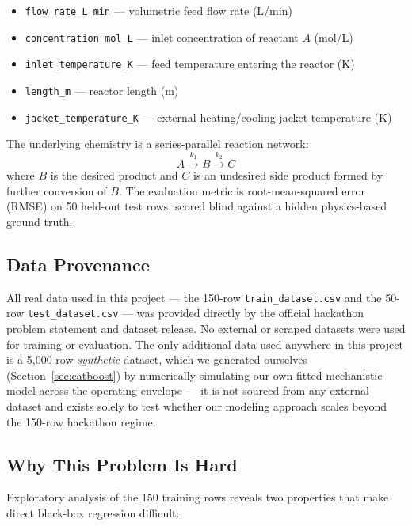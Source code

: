 \documentclass[11pt,a4paper]{article}
\begin{document}
\begin{itemize}[nosep]
  \item \texttt{flow\_rate\_L\_min} --- volumetric feed flow rate (L/min)
  \item \texttt{concentration\_mol\_L} --- inlet concentration of reactant $A$ (mol/L)
  \item \texttt{inlet\_temperature\_K} --- feed temperature entering the reactor (K)
  \item \texttt{length\_m} --- reactor length (m)
  \item \texttt{jacket\_temperature\_K} --- external heating/cooling jacket temperature (K)
\end{itemize}

\noindent The underlying chemistry is a series-parallel reaction network:
\begin{equation}
  A \xrightarrow{k_1} B \xrightarrow{k_2} C
\end{equation}
where $B$ is the desired product and $C$ is an undesired side product formed by further
conversion of $B$. The evaluation metric is root-mean-squared error (RMSE) on 50 held-out test
rows, scored blind against a hidden physics-based ground truth.

\subsection{Data Provenance}

All real data used in this project --- the 150-row \texttt{train\_dataset.csv} and the 50-row
\texttt{test\_dataset.csv} --- was provided directly by the official hackathon problem statement
and dataset release. No external or scraped datasets were used for training or evaluation. The
only additional data used anywhere in this project is a 5{,}000-row \emph{synthetic} dataset,
which we generated ourselves (Section~\ref{sec:catboost}) by numerically simulating our own
fitted mechanistic model across the operating envelope --- it is not sourced from any external
dataset and exists solely to test whether our modeling approach scales beyond the 150-row
hackathon regime.

\subsection{Why This Problem Is Hard}

Exploratory analysis of the 150 training rows reveals two properties that make direct black-box
regression difficult:
\end{document}
